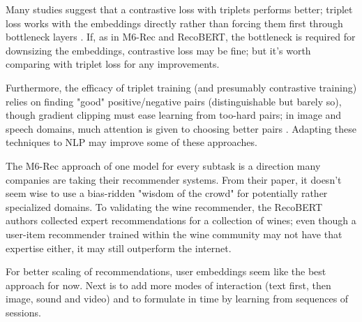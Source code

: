 \documentclass[11pt]{article}
\begin{document}
Many studies suggest that a contrastive loss with triplets performs better; triplet loss works with the embeddings directly rather than forcing them first through bottleneck layers \cite{FaceNet}. If, as in M6-Rec and RecoBERT, the bottleneck is required for downsizing the embeddings, contrastive loss may be fine; but it's worth comparing with triplet loss for any improvements.

Furthermore, the efficacy of triplet training (and presumably contrastive training) relies on finding "good" positive/negative pairs (distinguishable but barely so), though gradient clipping must ease learning from too-hard pairs; in image and speech domains, much attention is given to choosing better pairs \cite{triplepairs}. Adapting these techniques to NLP may improve some of these approaches. 

The M6-Rec approach of one model for every subtask is a direction many companies are taking their recommender systems. From their paper, it doesn't seem wise to use a bias-ridden "wisdom of the crowd" for potentially rather specialized domains. To validating the wine recommender, the RecoBERT authors collected expert recommendations for a collection of wines; even though a user-item recommender trained within the wine community may not have that expertise either, it may still outperform the internet. 

For better scaling of recommendations, user embeddings seem like the best approach for now. Next is to add more modes of interaction (text first, then image, sound and video) and to formulate in time by learning from sequences of sessions.








\end{document}
